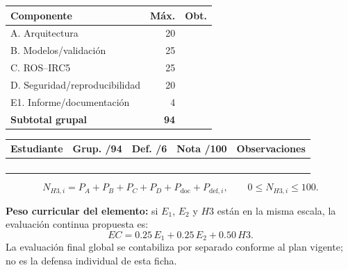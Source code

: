 \documentclass[10pt, a4paper]{article}
\begin{document}
\begin{minipage}[t]{0.42\textwidth}
\footnotesize
\setlength{\tabcolsep}{4pt}
\renewcommand{\arraystretch}{1.35}
\begin{tabularx}{\linewidth}{|X|r|r|}
\hline
\rowcolor{ucbblue!15}
\textbf{Componente} & \textbf{Máx.} & \textbf{Obt.} \\ \hline
A. Arquitectura & 20 & \\ \hline
B. Modelos/validación & 25 & \\ \hline
C. ROS–IRC5 & 25 & \\ \hline
D. Seguridad/reproducibilidad & 20 & \\ \hline
E1. Informe/documentación & 4 & \\ \hline
\rowcolor{offcolor}
\textbf{Subtotal grupal} & \textbf{94} & \\ \hline
\end{tabularx}
\end{minipage}
\hfill
\begin{minipage}[t]{0.55\textwidth}
\footnotesize
\setlength{\tabcolsep}{3.5pt}
\renewcommand{\arraystretch}{1.48}
\begin{tabularx}{\linewidth}{|>{\hsize=1.05\hsize\raggedright\arraybackslash}X|r|r|r|>{\hsize=0.95\hsize\raggedright\arraybackslash}X|}
\hline
\rowcolor{ucbblue!15}
\textbf{Estudiante} & \textbf{Grup. /94} & \textbf{Def. /6} & \textbf{Nota /100} & \textbf{Observaciones} \\ \hline
& & & & \\ \hline
& & & & \\ \hline
& & & & \\ \hline
& & & & \\ \hline
\end{tabularx}
\end{minipage}

\vspace{4pt}
\begin{equation}
    N_{H3,i} = P_A + P_B + P_C + P_D + P_{\mathrm{doc}} + P_{\mathrm{def},i}, \qquad 0 \le N_{H3,i} \le 100.
    \label{eq:nota_h3}
\end{equation}

\textbf{Peso curricular del elemento:} si $E_1$, $E_2$ y $H3$ están en la misma escala, la evaluación continua propuesta es:
\begin{equation}
    EC = 0.25\,E_1 + 0.25\,E_2 + 0.50\,H3.
    \label{eq:ec}
\end{equation}
{\footnotesize La evaluación final global se contabiliza por separado conforme al plan vigente; no es la defensa individual de esta ficha.}
\end{document}
